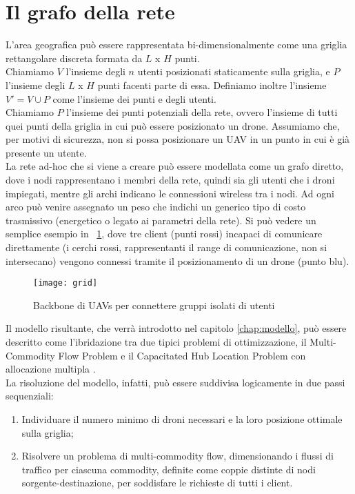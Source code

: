 \section{Il grafo della rete} \label{sect:graforete}
L'area geografica può essere rappresentata bi-dimensionalmente come una griglia rettangolare discreta formata da $L$ x $H$ punti. \\
Chiamiamo $V$ l'insieme degli $n$ utenti posizionati staticamente sulla griglia, e $P$ l'insieme degli $L$ x $H$ punti facenti parte di essa. Definiamo inoltre l'insieme $V' = V \cup P$ come l'insieme dei punti e degli utenti. \\
Chiamiamo $P$ l'insieme dei punti potenziali della rete, ovvero l'insieme di tutti quei punti della griglia in cui può essere posizionato un drone. Assumiamo che, per motivi di sicurezza, non si possa posizionare un UAV in un punto in cui è già presente un utente. \\
La rete ad-hoc che si viene a creare può essere modellata come un grafo diretto, dove i nodi rappresentano i membri della rete, quindi sia gli utenti che i droni impiegati, mentre gli archi indicano le connessioni wireless tra i nodi. Ad ogni arco può venire assegnato un peso che indichi un generico tipo di costo trasmissivo (energetico o legato ai parametri della rete). Si può vedere un semplice esempio in \figurename\ \ref{fig:grid}, dove tre client (punti rossi) incapaci di comunicare direttamente (i cerchi rossi, rappresentanti il range di comunicazione, non si intersecano) vengono connessi tramite il posizionamento di un drone (punto blu). \\
%
\begin{figure}
	\begin{center}
		\texttt{[image: grid]}
	\end{center}
	\caption{Backbone di UAVs per connettere gruppi isolati di utenti} \label{fig:grid}
\end{figure}
%
Il modello risultante, che verrà introdotto nel capitolo \ref{chap:modello}, può essere descritto come l'ibridazione tra due tipici problemi di ottimizzazione, il Multi-Commodity Flow Problem \cite{doi101287opre262209} e il Capacitated Hub Location Problem con allocazione multipla \cite{Alumur20081}. \\
La risoluzione del modello, infatti, può essere suddivisa logicamente in due passi sequenziali:
\begin{enumerate}  
	\item Individuare il numero minimo di droni necessari e la loro posizione ottimale sulla griglia; 
	\item Risolvere un problema di multi-commodity flow, dimensionando i flussi di traffico per ciascuna commodity, definite come coppie distinte di nodi sorgente-destinazione, per soddisfare le richieste di tutti i client.
\end{enumerate}
